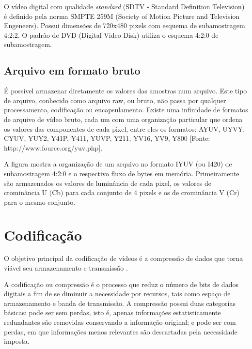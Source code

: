 
O vídeo digital com qualidade \emph{standard} (SDTV - Standard Definition Television) é definido pela norma SMPTE 259M (Society of Motion Picture and Television Engeneers). Possui dimensões de 720x480 pixels com esquema de subamostragem 4:2:2. O padrão de DVD (Digital Video Disk) utiliza o esquema 4:2:0 de subamostragem.

\subsection{Arquivo em formato bruto}

É possível armazenar diretamente os valores das amostras num arquivo. Este tipo de arquivo, conhecido como arquivo raw, ou bruto, não passa por qualquer processamento, codificação ou encapsulamento. Existe uma infinidade de formatos de arquivo de vídeo bruto, cada um com uma organização particular que ordena os valores das componentes de cada pixel, entre eles os formatos: AYUV, UYVY, CYUV, YUY2, Y41P, Y411, YUVP, Y211, YV16, YV9, Y800 [Fonte: http://www.fourcc.org/yuv.php].

A figura mostra a organização de um arquivo no formato IYUV (ou I420) de subamostragem 4:2:0 e o respectivo fluxo de bytes em memória. Primeiramente são armazenados os valores de luminância de cada pixel, os valores de crominância U (Cb) para cada conjunto de 4 pixels e os de crominância V (Cr) para o mesmo conjunto.


\section{Codificação}

O objetivo principal da codificação de vídeos é a compressão de dados que torna viável seu armazenamento e transmissão \cite{daronco}.

A codificação ou compressão é o processo que reduz o número de bits de dados digitais a fim de se diminuir a necessidade por recursos, tais como espaço de armazenamento e banda de transmissão. A compressão possui duas categorias básicas: pode ser sem perdas, isto é, apenas informações estatisticamente redundantes são removidas conservando a informação original; e pode ser com perdas, em que informações menos relevantes são descartadas pela necessidade imposta.

